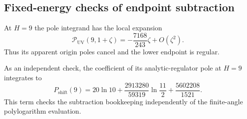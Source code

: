 \subsection{Fixed-energy checks of endpoint subtraction}
At $H=9$ the pole integrand has the local expansion
\begin{equation}
 \mathcal P_{\mathrm{UV}}(9,1+\zeta)
 =-\frac{7168}{243}\zeta+O(\zeta^2).
\end{equation}
Thus its apparent origin poles cancel and the lower endpoint is regular.

As an independent check, the coefficient of its analytic-regulator pole
at $H=9$ integrates to
\begin{equation}
 P_{\mathrm{shift}}(9)
 =20\ln10+\frac{2913280}{59319}\ln\frac{11}{2}
 +\frac{5602208}{1521}.
\end{equation}
This term checks the subtraction bookkeeping independently of the
finite-angle polylogarithm evaluation.
